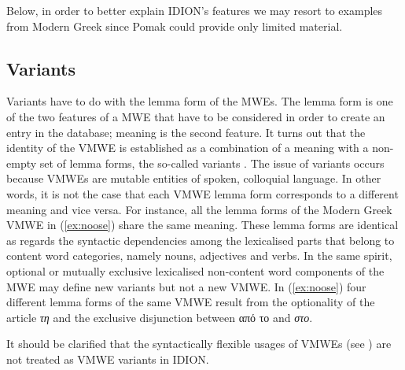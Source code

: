\documentclass[output=paper,colorlinks,citecolor=brown]{langscibook}
\begin{document}
Below, in order to better explain IDION's features we may resort to examples from Modern Greek since Pomak could provide only limited material. 

\subsection{Variants}
\label{sec:variants}

Variants have to do with the lemma form of the MWEs.  The lemma form is one of the two features of a MWE that have to be considered in order to create an entry in the database; meaning is the second feature.   It turns out that the identity of the VMWE is established as a combination of a meaning with a non-empty set of lemma forms,  the so-called variants \citep{chechdatabase}. The issue of variants occurs because VMWEs are mutable entities of spoken, colloquial language. In other words, it is not the case that each VMWE lemma form corresponds to a different meaning and vice versa. For instance, all the lemma forms of the Modern Greek VMWE in (\ref{ex:noose}) share the same meaning. These lemma forms are identical as regards the syntactic dependencies among the lexicalised parts that belong to content word categories, namely nouns, adjectives and verbs. In the same spirit, optional or mutually exclusive lexicalised non-content word components of the MWE may define new variants but not a new VMWE. In (\ref{ex:noose})  four different lemma forms of the same VMWE result from the optionality of the  article \textit{τη} and the exclusive disjunction between  { από το} and  \textit{στο}. 

 It should be clarified that the syntactically flexible usages of VMWEs (see ) are not treated as VMWE variants in IDION. 
 
\end{document}
